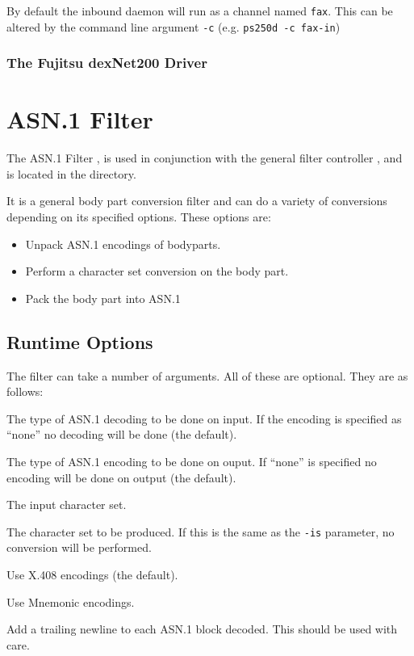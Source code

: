 By default the inbound daemon will run as a channel named \verb+fax+.
This can be altered by the command line argument \verb+-c+ (e.g.
\verb+ps250d -c fax-in+)

\subsubsection {The Fujitsu dexNet200 Driver}

\section {ASN.1 Filter}

The ASN.1 Filter , is used in conjunction with the 
general filter controller , and is located in the 
 directory.

It is a general body part conversion filter and can do 
a variety of conversions depending on its specified options.  These
options are:

\begin{itemize}
\item Unpack ASN.1 encodings of bodyparts.
\item Perform a character set conversion on the body part. 
\item Pack the body part into ASN.1
\end {itemize}

\subsection {Runtime Options}

The  filter can take a number of arguments. All of these are
optional. They are as
follows:
\begin{describe}
\item[\verb|-ia encoding|:] The type of ASN.1 decoding to be done on
input. If the encoding is specified as ``none'' no decoding will be
done (the default).

\item[\verb|-oa encoding|:] The type of ASN.1 encoding to be done on
ouput. If ``none'' is specified no encoding will be done on output
(the default).

\item[\verb|-is charset|:] The input character set.
\item[\verb|-os charset|:] The character set to be produced. If this
is the same as the \verb|-is| parameter, no conversion will be
performed. 
\item[\verb|-x|:] Use X.408 encodings (the default).
\item[\verb|-m|:] Use Mnemonic encodings.
\item[\verb|-l|:] Add a trailing newline to each ASN.1 block decoded.
This should be used with care.
\end{describe}

